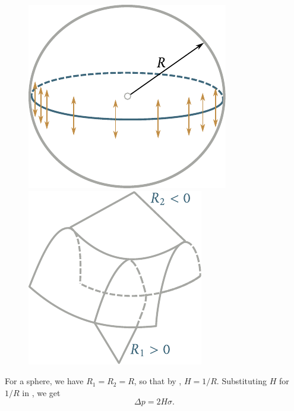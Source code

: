 \begin{figure}[t]
	\begin{minipage}[t]{0.5\linewidth}
		\begin{center}
			\includegraphics[scale=1]{figures/ch_14/fig_14_4.pdf}
			\caption[]{}
			\label{fig:14_4}
		\end{center}
	\end{minipage}
	\hspace{-0.05cm}
	\begin{minipage}[t]{0.5\linewidth}
		\begin{center}
			\includegraphics[scale=1]{figures/ch_14/fig_14_5.pdf}
			\caption[]{}
			\label{fig:14_5}
		\end{center}
	\end{minipage}
	\vspace{-0.4cm}
\end{figure}

For a sphere, we have $R_1=R_2=R$, so that by , $H=1/R$. Substituting $H$ for $1/R$ in , we get
\begin{equation}\label{eq:14_3}
	\Delta p = 2H\sigma.
\end{equation}

